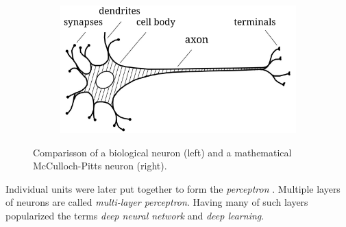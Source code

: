 \begin{figure}[ht]
    \centering
    \begin{subfigure}{0.49\textwidth}
        \raggedright
        \includegraphics[width=\textwidth]{assets/bio_neuron.pdf}
    \end{subfigure}
    \begin{subfigure}{0.5\textwidth}
        \raggedleft
    \end{subfigure}
    \caption{Comparisson of a biological neuron \cite{bio-neuron} (left) and a mathematical McCulloch-Pitts neuron (right).}
    \label{fig:neuron}
\end{figure}
Individual units were later put together to form the \textit{perceptron} \cite{first-perceptron}. Multiple layers of neurons are called \textit{multi-layer perceptron}. Having many of such layers popularized the terms \textit{deep neural network} and \textit{deep learning}.

